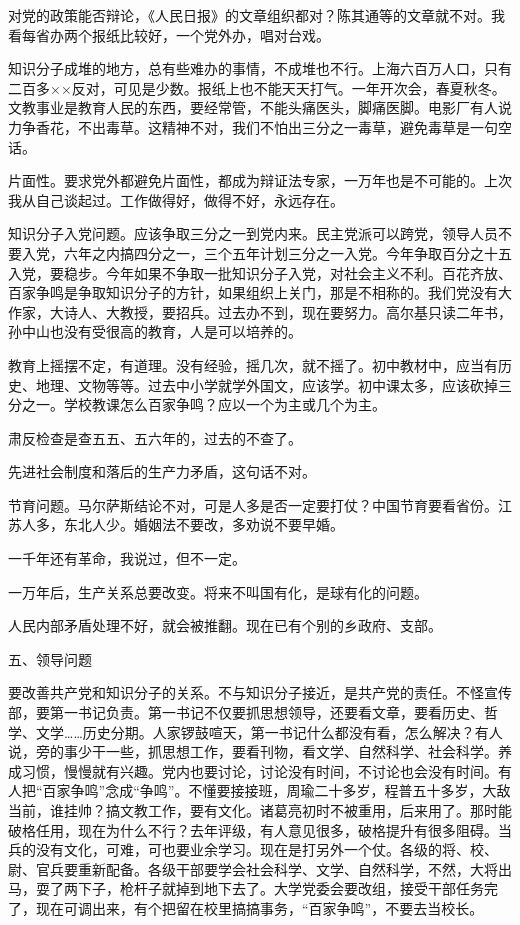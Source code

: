 对党的政策能否辩论，《人民日报》的文章组织都对？陈其通等的文章就不对。我看每省办两个报纸比较好，一个党外办，唱对台戏。

知识分子成堆的地方，总有些难办的事情，不成堆也不行。上海六百万人口，只有二百多××反对，可见是少数。报纸上也不能天天打气。一年开次会，春夏秋冬。文教事业是教育人民的东西，要经常管，不能头痛医头，脚痛医脚。电影厂有人说力争香花，不出毒草。这精神不对，我们不怕出三分之一毒草，避免毒草是一句空话。

片面性。要求党外都避免片面性，都成为辩证法专家，一万年也是不可能的。上次我从自己谈起过。工作做得好，做得不好，永远存在。

知识分子入党问题。应该争取三分之一到党内来。民主党派可以跨党，领导人员不要入党，六年之内搞四分之一，三个五年计划三分之一入党。今年争取百分之十五入党，要稳步。今年如果不争取一批知识分子入党，对社会主义不利。百花齐放、百家争鸣是争取知识分子的方针，如果组织上关门，那是不相称的。我们党没有大作家，大诗人、大教授，要招兵。过去办不到，现在要努力。高尔基只读二年书，孙中山也没有受很高的教育，人是可以培养的。

教育上摇摆不定，有道理。没有经验，摇几次，就不摇了。初中教材中，应当有历史、地理、文物等等。过去中小学就学外国文，应该学。初中课太多，应该砍掉三分之一。学校教课怎么百家争鸣？应以一个为主或几个为主。

肃反检查是查五五、五六年的，过去的不查了。

先进社会制度和落后的生产力矛盾，这句话不对。

节育问题。马尔萨斯结论不对，可是人多是否一定要打仗？中国节育要看省份。江苏人多，东北人少。婚姻法不要改，多劝说不要早婚。

一千年还有革命，我说过，但不一定。

一万年后，生产关系总要改变。将来不叫国有化，是球有化的问题。

人民内部矛盾处理不好，就会被推翻。现在已有个别的乡政府、支部。

五、领导问题

要改善共产党和知识分子的关系。不与知识分子接近，是共产党的责任。不怪宣传部，要第一书记负责。第一书记不仅要抓思想领导，还要看文章，要看历史、哲学、文学……历史分期。人家锣鼓喧天，第一书记什么都没有看，怎么解决？有人说，旁的事少干一些，抓思想工作，要看刊物，看文学、自然科学、社会科学。养成习惯，慢慢就有兴趣。党内也要讨论，讨论没有时间，不讨论也会没有时间。有人把“百家争鸣”念成“争鸣”。不懂要接接班，周瑜二十多岁，程普五十多岁，大敌当前，谁挂帅？搞文教工作，要有文化。诸葛亮初时不被重用，后来用了。那时能破格任用，现在为什么不行？去年评级，有人意见很多，破格提升有很多阻碍。当兵的没有文化，可难，可也要业余学习。现在是打另外一个仗。各级的将、校、尉、官兵要重新配备。各级干部要学会社会科学、文学、自然科学，不然，大将出马，耍了两下子，枪杆子就掉到地下去了。大学党委会要改组，接受干部任务完了，现在可调出来，有个把留在校里搞搞事务，“百家争鸣”，不要去当校长。

